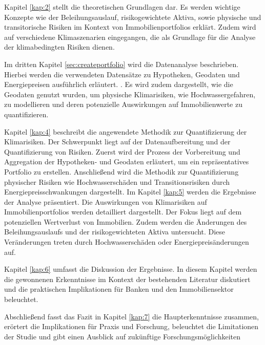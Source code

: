 Kapitel \ref{kap:2} stellt die theoretischen Grundlagen dar. Es werden wichtige Konzepte wie der Beleihungsauslauf, risikogewichtete Aktiva, sowie physische und transitorische Risiken im Kontext von Immobilienportfolios erklärt. Zudem wird auf verschiedene Klimaszenarien eingegangen, die als Grundlage für die Analyse der klimabedingten Risiken dienen.

Im dritten Kapitel \ref{sec:createportfolio} wird die Datenanalyse beschrieben. Hierbei werden die verwendeten Datensätze zu Hypotheken, Geodaten und Energiepreisen ausführlich erläutert. . Es wird zudem dargestellt, wie die Geodaten genutzt wurden, um physische Klimarisiken, wie Hochwassergefahren, zu modellieren und deren potenzielle Auswirkungen auf Immobilienwerte zu quantifizieren.

Kapitel \ref{kap:4} beschreibt die angewendete Methodik zur Quantifizierung der Klimarisiken. Der Schwerpunkt liegt auf der Datenaufbereitung und der Quantifizierung von Risiken. Zuerst wird der Prozess der Vorbereitung und Aggregation der Hypotheken- und Geodaten erläutert, um ein repräsentatives Portfolio zu erstellen. Anschließend wird die Methodik zur Quantifizierung physischer Risiken wie Hochwasserschäden und Transitionsrisiken durch Energiepreisschwankungen dargestellt. 
Im Kapitel \ref{kap:5} werden die Ergebnisse der Analyse präsentiert. Die Auswirkungen von Klimarisiken auf Immobilienportfolios werden detailliert dargestellt. Der Fokus liegt auf dem potenziellen Wertverlust von Immobilien. Zudem werden die Änderungen des Beleihungsauslaufs und der risikogewichteten Aktiva untersucht. Diese Veränderungen treten durch Hochwasserschäden oder Energiepreisänderungen auf.

Kapitel \ref{kap:6} umfasst die Diskussion der Ergebnisse. In diesem Kapitel werden die gewonnenen Erkenntnisse im Kontext der bestehenden Literatur diskutiert und die praktischen Implikationen für Banken und den Immobiliensektor beleuchtet.

Abschließend fasst das Fazit in Kapitel \ref{kap:7} die Haupterkenntnisse zusammen, erörtert die Implikationen für Praxis und Forschung, beleuchtet die Limitationen der Studie und gibt einen Ausblick auf zukünftige Forschungsmöglichkeiten